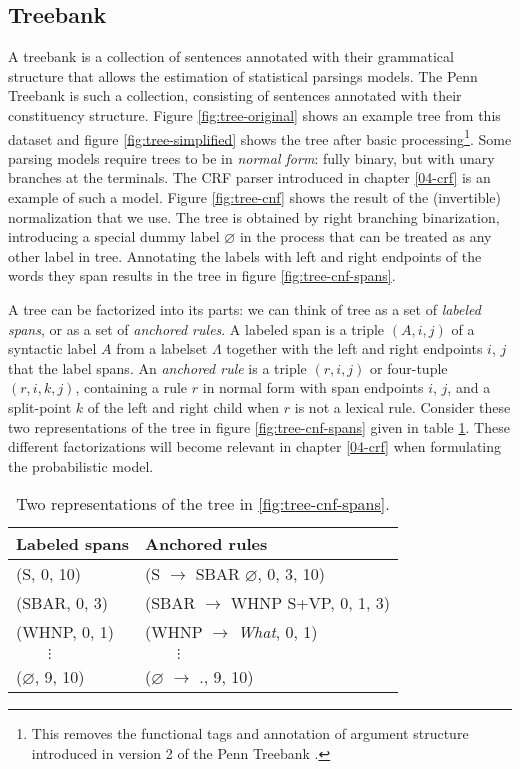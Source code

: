   \subsection{Treebank}
    A treebank is a collection of sentences annotated with their grammatical structure that allows the estimation of statistical parsings models. The Penn Treebank \citep{marcus1993penn} is such a collection, consisting of sentences annotated with their constituency structure. Figure \ref{fig:tree-original} shows an example tree from this dataset and figure \ref{fig:tree-simplified} shows the tree after basic processing\footnote{This removes the functional tags and annotation of argument structure introduced in version 2 of the Penn Treebank \citep{marcus1994annotating}.}. Some parsing models require trees to be in \textit{normal form}: fully binary, but with unary branches at the terminals. The CRF parser introduced in chapter \ref{04-crf} is an example of such a model. Figure \ref{fig:tree-cnf} shows the result of the (invertible) normalization that we use. The tree is obtained by right branching binarization, introducing a special dummy label $\varnothing$ in the process that can be treated as any other label in tree. Annotating the labels with left and right endpoints of the words they span results in the tree in figure \ref{fig:tree-cnf-spans}.

    A tree can be factorized into its parts: we can think of tree as a set of \textit{labeled spans}, or as a set of \textit{anchored rules}. A labeled span is a triple $(A, i, j)$ of a syntactic label $A$ from a labelset $\Lambda$ together with the left and right endpoints $i$, $j$ that the label spans. An \textit{anchored rule} is a triple $(r, i, j)$ or four-tuple $(r, i, k, j)$, containing a rule $r$ in normal form with span endpoints $i$, $j$, and a split-point $k$ of the left and right child when $r$ is not a lexical rule. Consider these two representations of the tree in figure \ref{fig:tree-cnf-spans} given in table \ref{tab:spans-rules}. These different factorizations will become relevant in chapter \ref{04-crf} when formulating the probabilistic model.

    \begin{table}[h]
      \center
      \small
      \bgroup  %
      \def\arraystretch{1.5}  %
      \begin{tabular}{l|l}
        Labeled spans & Anchored rules \\
        \hline
        (S, 0, 10)     & (S $\to$ SBAR $\varnothing$, 0, 3, 10)  \\
        (SBAR, 0, 3)   & (SBAR $\to$ WHNP S+VP, 0, 1, 3)  \\
        (WHNP, 0, 1)     & (WHNP $\to$ \textit{What}, 0, 1)  \\
        $\qquad\vdots$ & $\qquad\vdots$  \\
        ($\varnothing$, 9, 10)     & ($\varnothing$ $\to$ ., 9, 10)  \\
      \end{tabular}
      \caption{Two representations of the tree in \ref{fig:tree-cnf-spans}.}
      \label{tab:spans-rules}
      \egroup  %
    \end{table}



